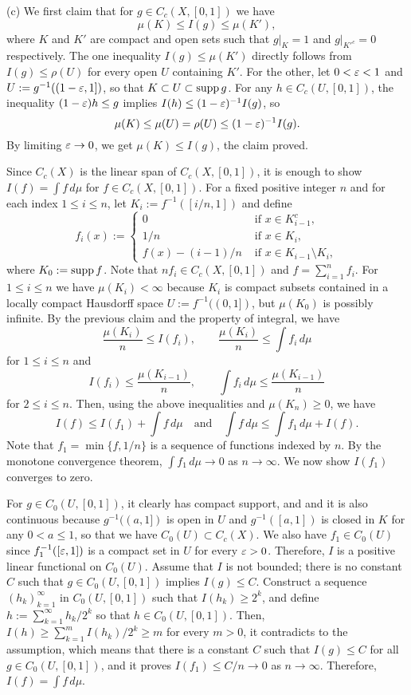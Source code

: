 \documentclass{../note}
\begin{document}
\begin{pf}
(c)
We first claim that for $g\in C_c(X,[0,1])$ we have
\[\mu(K)\le I(g)\le\mu(K'),\]
where $K$ and $K'$ are compact and open sets such that $g|_K=1$ and $g|_{K'^c}=0$ respectively.
The one inequality $I(g)\le\mu(K')$ directly follows from $I(g)\le\rho(U)$ for every open $U$ containing $K'$.
For the other, let $0<\varepsilon<1$ and $U:=g^{-1}((1-\varepsilon,1])$, so that $K\subset U\subset\operatorname{supp} g$.
For any $h\in C_c(U,[0,1])$, the inequality $(1-\varepsilon)h\le g$ implies $I(h)\le(1-\varepsilon)^{-1}I(g)$, so
\[\mu(K)\le\mu(U)=\rho(U)\le(1-\varepsilon)^{-1}I(g).\]
By limiting $\varepsilon\to0$, we get $\mu(K)\le I(g)$, the claim proved.

Since $C_c(X)$ is the linear span of $C_c(X,[0,1])$, it is enough to show $I(f)=\int f\,d\mu$ for $f\in C_c(X,[0,1])$.
For a fixed positive integer $n$ and for each index $1\le i\le n$, let $K_i:=f^{-1}([i/n,1])$ and define
\[f_i(x):=\begin{cases}0&\text{ if }x\in K_{i-1}^c,\\1/n&\text{ if }x\in K_i,\\f(x)-(i-1)/n&\text{ if }x\in K_{i-1}\setminus K_i,\end{cases}\]
where $K_0:=\operatorname{supp} f$.
Note that $nf_i\in C_c(X,[0,1])$ and $f=\sum_{i=1}^nf_i$.
For $1\le i\le n$ we have $\mu(K_i)<\infty$ because $K_i$ is compact subsets contained in a locally compact Hausdorff space $U:=f^{-1}((0,1])$, but $\mu(K_0)$ is possibly infinite.
By the previous claim and the property of integral, we have
\[\frac{\mu(K_i)}n\le I(f_i),\qquad\frac{\mu(K_i)}n\le\int f_i\,d\mu\]
for $1\le i\le n$ and
\[I(f_i)\le\frac{\mu(K_{i-1})}n,\qquad\int f_i\,d\mu\le\frac{\mu(K_{i-1})}n\]
for $2\le i\le n$.
Then, using the above inequalities and $\mu(K_n)\ge0$, we have
\[I(f)\le I(f_1)+\int f\,d\mu\quad\text{and}\quad\int f\,d\mu\le\int f_1\,d\mu+I(f).\]
Note that $f_1=\min\{f,1/n\}$ is a sequence of functions indexed by $n$.
By the monotone convergence theorem, $\int f_1\,d\mu\to0$ as $n\to\infty$.
We now show $I(f_1)$ converges to zero.

For $g\in C_0(U,[0,1])$, it clearly has compact support, and and it is also continuous because $g^{-1}((a,1])$ is open in $U$ and $g^{-1}([a,1])$ is closed in $K$ for any $0<a\le1$, so that we have $C_0(U)\subset C_c(X)$.
We also have $f_1\in C_0(U)$ since $f_1^{-1}([\varepsilon,1])$ is a compact set in $U$ for every $\varepsilon>0$.
Therefore, $I$ is a positive linear functional on $C_0(U)$.
Assume that $I$ is not bounded; there is no constant $C$ such that $g\in C_0(U,[0,1])$ implies $I(g)\le C$.
Construct a sequence $(h_k)_{k=1}^\infty$ in $C_0(U,[0,1])$ such that $I(h_k)\ge2^k$, and define $h:=\sum_{k=1}^\infty h_k/2^k$ so that $h\in C_0(U,[0,1])$.
Then, $I(h)\ge \sum_{k=1}^mI(h_k)/2^k\ge m$ for every $m>0$, it contradicts to the assumption, which means that there is a constant $C$ such that $I(g)\le C$ for all $g\in C_0(U,[0,1])$, and it proves $I(f_1)\le C/n\to0$ as $n\to\infty$.
Therefore, $I(f)=\int f\,d\mu$.
\end{pf}
\end{document}
